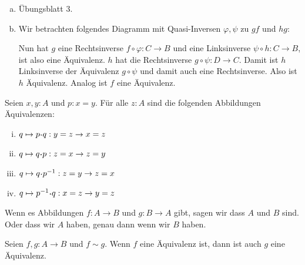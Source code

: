 \begin{beweis}
  \begin{enumerate}[(a)]
  \item Übungsblatt 3.
  \item Wir betrachten folgendes Diagramm mit Quasi-Inversen $\varphi,\psi$ zu $gf$ und $hg$:
    \begin{center}
    \end{center}
    Nun hat $g$ eine Rechtsinverse $f\circ \varphi:C\to B$ und eine Linksinverse $\psi\circ h:C\to B$,
    ist also eine Äquivalenz.
    $h$ hat die Rechtsinverse $g\circ \psi:D\to C$. Damit ist $h$ Linksinverse der Äquivalenz $g\circ \psi$ und damit auch eine Rechtsinverse. Also ist $h$ Äquivalenz.
    Analog ist $f$ eine Äquivalenz.
  \end{enumerate}
\end{beweis}

\begin{lemma}
  \label{kon-equiv}
  Seien $x,y:A$ und $p:x=y$. Für alle $z:A$ sind die folgenden Abbildungen Äquivalenzen:
  \begin{enumerate}[(i)]
  \item $q\mapsto p\kon q:y=z\to x=z$
  \item $q\mapsto q\kon p:z=x\to z=y$
  \item $q\mapsto q\kon p^{-1}:z=y\to z=x$
  \item $q\mapsto p^{-1}\kon q:x=z\to y=z$
  \end{enumerate}
\end{lemma}

\begin{definition}
  Wenn es Abbildungen $f:A\to B$ und $g:B\to A$ gibt, sagen wir dass $A$ und $B$  sind. Oder dass wir $A$ haben, genau dann wenn wir $B$ haben. 
\end{definition}

\begin{lemma}
  \label{equiv-homotopy-stable}
  Seien $f,g:A\to B$ und $f\sim g$. Wenn $f$ eine Äquivalenz ist, dann ist auch $g$ eine Äquivalenz.
\end{lemma}

